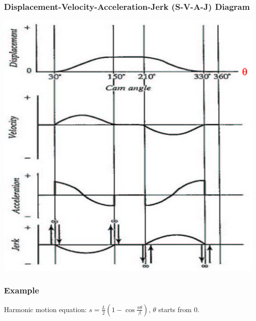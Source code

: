 \documentclass[11pt]{article}
\begin{document}
\subsubsection{Displacement-Velocity-Acceleration-Jerk (S-V-A-J) Diagram}
\label{sec:org72264ef}
\begin{center}
\includegraphics[width=.9\linewidth]{./images/simple-harmonic-motion-svaj-diagram.png}
\end{center}
\subsubsection{Example}
\label{sec:org39ff2cb}
Harmonic motion equation: \(s = \frac{L}{2} \left(1 - \cos \frac{\pi \theta}{\beta} \right)\), \(\theta\) starts from 0.
\end{document}

